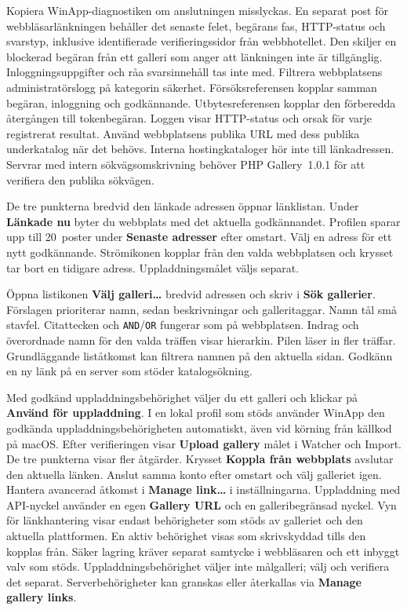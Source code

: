\documentclass[11pt,a4paper]{article}
\newcommand{\ui}[1]{\textbf{#1}}
\begin{document}
Kopiera WinApp-diagnostiken om anslutningen misslyckas. En separat post för
webbläsarlänkningen behåller det senaste felet, begärans fas, HTTP-status
och svarstyp, inklusive identifierade verifieringssidor från webbhotellet.
Den skiljer en blockerad begäran från ett galleri som anger att länkningen
inte är tillgänglig. Inloggningsuppgifter och råa svarsinnehåll tas inte med.
Filtrera webbplatsens administratörslogg på kategorin säkerhet.
Försöksreferensen kopplar samman begäran, inloggning och godkännande.
Utbytesreferensen kopplar den förberedda återgången till tokenbegäran.
Loggen visar HTTP-status och orsak för varje registrerat resultat.
Använd webbplatsens publika URL med dess publika underkatalog när det behövs.
Interna hostingkataloger hör inte till länkadressen. Servrar med intern
sökvägsomskrivning behöver PHP Gallery~1.0.1 för att verifiera den publika sökvägen.

De tre punkterna bredvid den länkade adressen öppnar länklistan.
Under \ui{Länkade nu} byter du webbplats med det aktuella godkännandet.
Profilen sparar upp till 20~poster under \ui{Senaste adresser} efter omstart.
Välj en adress för ett nytt godkännande. Strömikonen kopplar från den
valda webbplatsen och krysset tar bort en tidigare adress.
Uppladdningsmålet väljs separat.

Öppna listikonen \ui{Välj galleri…} bredvid adressen och skriv i
\ui{Sök gallerier}.
Förslagen prioriterar namn, sedan beskrivningar och galleritaggar. Namn tål
små stavfel. Citattecken och \texttt{AND}/\texttt{OR} fungerar som på
webbplatsen. Indrag och överordnade namn för den valda träffen visar hierarkin.
Pilen läser in fler träffar. Grundläggande liståtkomst kan filtrera namnen på
den aktuella sidan. Godkänn en ny länk på en server som stöder katalogsökning.

Med godkänd uppladdningsbehörighet väljer du ett galleri och klickar på
\ui{Använd för uppladdning}. I en lokal profil som stöds använder WinApp den godkända
uppladdningsbehörigheten automatiskt, även vid körning från källkod på macOS.
Efter verifieringen visar \ui{Upload gallery}
målet i Watcher och Import. De tre punkterna visar fler åtgärder.
Krysset \ui{Koppla från webbplats} avslutar den aktuella länken. Anslut samma
konto efter omstart och välj galleriet igen. Hantera avancerad åtkomst i
\ui{Manage link…} i inställningarna. Uppladdning med API-nyckel använder en
egen \ui{Gallery URL} och en galleribegränsad nyckel.
Vyn för länkhantering visar endast behörigheter som stöds av galleriet och den
aktuella plattformen. En aktiv behörighet visas som skrivskyddad tills den
kopplas från. Säker lagring kräver separat samtycke i webbläsaren och ett
inbyggt valv som stöds. Uppladdningsbehörighet väljer inte målgalleri; välj och
verifiera det separat. Serverbehörigheter kan granskas eller återkallas via
\ui{Manage gallery links}.
\end{document}
